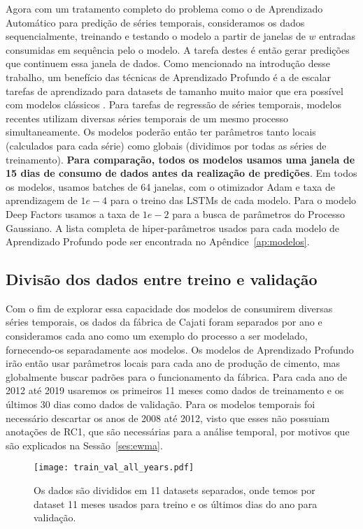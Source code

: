 Agora com um tratamento completo do problema como o de Aprendizado Automático para predição de séries
temporais, consideramos os dados sequencialmente, treinando e testando o modelo a partir de janelas de $w$
entradas consumidas em sequência pelo o modelo. A tarefa destes é então gerar
predições que continuem essa janela de dados. Como mencionado na introdução desse trabalho, um benefício das técnicas de
Aprendizado Profundo é a de escalar tarefas de aprendizado para datasets de
tamanho muito maior que era possível com modelos clássicos \citep{dlbook}.
Para tarefas de regressão de séries temporais, modelos recentes utilizam
diversas séries temporais de um mesmo processo simultaneamente.
Os modelos poderão então ter parâmetros tanto locais (calculados
para cada série) como globais (dividimos por todas as séries de treinamento).
\textbf{Para comparação, todos os modelos usamos uma janela de 15 dias de consumo de dados antes da
  realização de predições}. Em todos os modelos, usamos batches de 64 janelas,
com o otimizador Adam e taxa de aprendizagem de $1e-4$ para o treino das LSTMs
de cada modelo. Para o modelo Deep Factors usamos a taxa de $1e-2$ para a busca
de parâmetros do Processo Gaussiano. A lista completa de hiper-parâmetros usados
para cada modelo de Aprendizado Profundo pode ser encontrada no Apêndice~\ref{ap:modelos}.

\subsection{Divisão dos dados entre treino e validação}

Com o fim de explorar essa capacidade dos modelos de consumirem diversas séries
temporais, os dados da fábrica de Cajati foram separados por ano e consideramos
cada ano como um exemplo do processo a ser modelado, fornecendo-os separadamente
aos modelos. Os modelos de Aprendizado
Profundo irão então usar parâmetros locais para cada ano de produção de cimento,
mas globalmente buscar padrões para o funcionamento da fábrica. Para cada ano de 2012 até 2019 usaremos os primeiros 11 meses como dados de
treinamento e os últimos 30 dias como dados de validação. Para os modelos temporais foi necessário descartar
os anos de 2008 até 2012, visto que esses não possuiam anotações de RC1, que são
necessárias para a análise temporal, por motivos que são explicados na Sessão~\ref{ses:ewma}.



\begin{figure}[H]
  \centering
  \texttt{[image: train\_val\_all\_years.pdf]} 
  \caption{Os dados são divididos em 11 datasets separados, onde temos por
    dataset 11 meses usados para treino e os últimos dias do ano para validação.} 
  \label{fig:trainvalallyears}
\end{figure}

